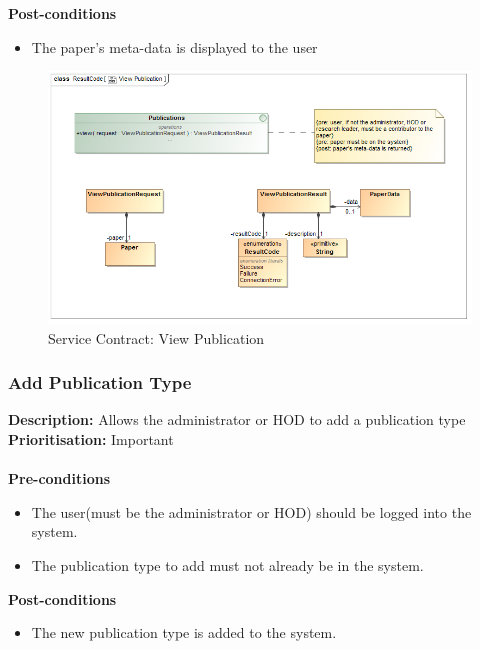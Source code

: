 \documentclass[a4paper]{article}
\begin{document}
    \textbf{Post-conditions}
    \begin{itemize}
        \item The paper's meta-data is displayed to the user
    \end{itemize}
    
            	\begin{figure}[H]
            		\centering
            		\includegraphics[width=\textwidth]{5.1.7.View.Publication.Services.Contract.png}
            		\caption{Service Contract: View Publication}
            	\end{figure}
    
\pagebreak

    \subsubsection{Add Publication Type}

    \textbf{Description:} Allows the administrator or HOD to add a publication type \\
        \textbf{Prioritisation:} Important\\
        \\
        
        
    \textbf{Pre-conditions}
     \begin{itemize}
        \item The user(must be the administrator or HOD) should be logged into the system.
        \item The publication type to add must not already be in the system.
   \end{itemize}
    
    \textbf{Post-conditions}
    \begin{itemize}
        \item The new publication type is added to the system.
    \end{itemize}
    
\end{document}
